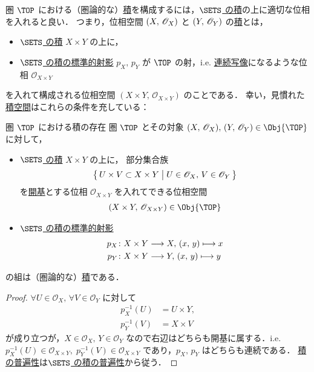 \documentclass[geometry_main]{subfiles}
\begin{document}
圏 $\TOP$ における（圏論的な）\hyperref[def:product]{積}を構成するには，\hyperref[prop:product-sets]{$\SETS$ の積}の上に適切な位相を入れると良い．
つまり，位相空間 $(X,\, \mathscr{O}_{X})$ と $(Y,\, \mathscr{O}_{Y})$ の\hyperref[def:product]{積}とは，
\begin{itemize}
	\item \hyperref[prop:product-sets]{$\SETS$ の積} $X \times Y$ の上に，
	\item \hyperref[prop:product-sets]{$\SETS$ の積の標準的射影} $p_X,\, p_Y$ が $\TOP$ の射，i.e. \hyperref[def.continuous]{連続写像}になるような位相 $\mathscr{O}_{X \times Y}$ 
\end{itemize}
を入れて構成される位相空間 $(X \times Y,\, \mathscr{O}_{X \times Y})$ のことである．
幸い，見慣れた\hyperref[def.prodtopo]{積空間}はこれらの条件を充している：
\begin{myprop}[label=prop:product-top]{圏 $\TOP$ における積の存在}
	圏 $\TOP$ とその対象 $\phase{X},\, \phase{Y} \in \Obj{\TOP}$ に対して，
	\begin{itemize}
		\item \hyperref[prop:product-sets]{$\SETS$ の積} $X \times Y$ の上に，
		部分集合族
		\begin{align}
			\bigl\{\, U \times V \subset X \times Y \bigm| U \in \mathscr{O}_X,\, V \in \mathscr{O}_Y \,\bigr\} 
		\end{align}
		を\hyperref[def.opbase]{開基}とする位相 $\mathscr{O}_{X\times Y}$ を入れてできる位相空間
		\begin{align}
			(X \times Y,\, \mathscr{O}_{X \times Y}) \in \Obj{\TOP}
		\end{align}
		\item \hyperref[prop:product-sets]{$\SETS$ の積の標準的射影}
		\begin{align}
			p_X &\colon X \times Y \longrightarrow X,\, (x,\, y) \longmapsto x \\
			p_Y &\colon X \times Y \longrightarrow Y,\, (x,\, y) \longmapsto y
		\end{align}
	\end{itemize}
	の組は（圏論的な）\hyperref[def:product]{積}である．
\end{myprop}

\begin{proof}
	$\forall U \in \mathscr{O}_X,\, \forall V \in \mathscr{O}_Y$ に対して
	\begin{align}
		p_X^{-1}(U) &= U \times Y, \\
		p_Y^{-1}(V) &= X \times V
	\end{align}
	が成り立つが，$X \in \mathscr{O}_X,\, Y \in \mathscr{O}_Y$ なので右辺はどちらも開基に属する．i.e. $p_X^{-1}(U) \in \mathscr{O}_{X \times Y},\; p_Y^{-1}(V) \in \mathscr{O}_{X \times Y}$ であり，$p_X,\, p_Y$ はどちらも連続である．
	\hyperref[cmtd:univ-product]{積の普遍性}は\hyperref[prop:product-sets]{$\SETS$ の積の普遍性}から従う．
\end{proof}
\end{document}
